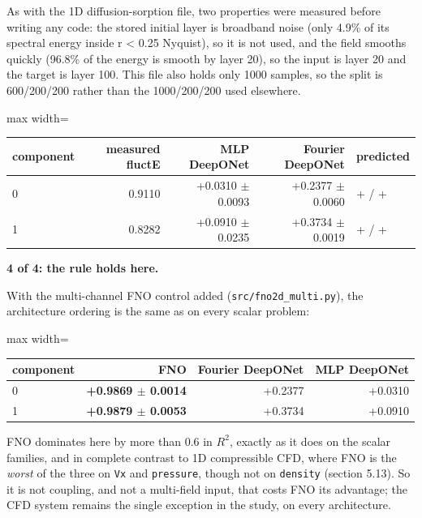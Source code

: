 \documentclass[preprint,12pt]{elsarticle}
\begin{document}
As with the 1D diffusion-sorption file, two properties were measured before writing any code: the stored initial layer is broadband noise (only 4.9\% of its spectral energy inside r < 0.25 Nyquist), so it is not used, and the field smooths quickly (96.8\% of the energy is smooth by layer 20), so the input is layer 20 and the target is layer 100. This file also holds only 1000 samples, so the split is 600/200/200 rather than the 1000/200/200 used elsewhere.

\begin{center}
\begin{adjustbox}{max width=\linewidth}
\small
\begin{tabular}{lrrrl}
\toprule
component & measured fluctE & MLP DeepONet & Fourier DeepONet & predicted \\
\midrule
0 & 0.9110 & +0.0310 $\pm$ 0.0093 & +0.2377 $\pm$ 0.0060 & + / + \\
1 & 0.8282 & +0.0910 $\pm$ 0.0235 & +0.3734 $\pm$ 0.0019 & + / + \\
\bottomrule
\end{tabular}
\end{adjustbox}
\end{center}


\textbf{4 of 4: the rule holds here.}

With the multi-channel FNO control added (\texttt{src/fno2d\_multi.py}), the architecture ordering is the same as on every scalar problem:

\begin{center}
\begin{adjustbox}{max width=\linewidth}
\small
\begin{tabular}{lrrr}
\toprule
component & FNO & Fourier DeepONet & MLP DeepONet \\
\midrule
0 & \textbf{+0.9869 $\pm$ 0.0014} & +0.2377 & +0.0310 \\
1 & \textbf{+0.9879 $\pm$ 0.0053} & +0.3734 & +0.0910 \\
\bottomrule
\end{tabular}
\end{adjustbox}
\end{center}


FNO dominates here by more than 0.6 in $R^2$, exactly as it does on the scalar families, and in complete contrast to 1D compressible CFD, where FNO is the \emph{worst} of the three on \texttt{Vx} and \texttt{pressure}, though not on \texttt{density} (section 5.13). So it is not coupling, and not a multi-field input, that costs FNO its advantage; the CFD system remains the single exception in the study, on every architecture.
\end{document}
